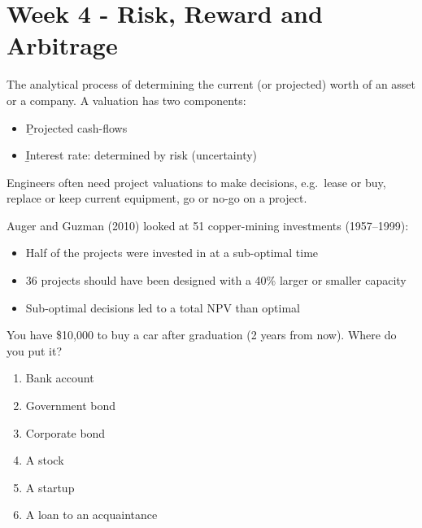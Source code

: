 
\section{Week 4 - Risk, Reward and Arbitrage}


\begin{definition}[Valuation]
    The analytical process of determining the current (or projected) worth
    of an asset or a company. A valuation has two components:
    \begin{itemize}
        \item \b{Projected cash-flows}
        \item \b{Interest rate}: determined by risk (uncertainty)
    \end{itemize}
\end{definition}
Engineers often need project valuations to make decisions, e.g.\ lease or
buy, replace or keep current equipment, go or no-go on a project.

Auger and Guzman (2010) looked at 51 copper-mining investments (1957--1999):
\begin{itemize}
    \item Half of the projects were invested in at a sub-optimal time
    \item 36 projects should have been designed with a 40\% larger or smaller capacity
    \item Sub-optimal decisions led to a total NPV  than optimal
\end{itemize}

You have \$10,000 to buy a car after graduation (2 years from now). Where do
you put it?
\begin{enumerate}
    \item Bank account
    \item Government bond
    \item Corporate bond
    \item A stock
    \item A startup
    \item A loan to an acquaintance
\end{enumerate}

